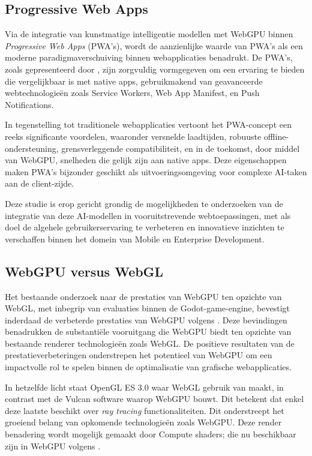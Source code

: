 \subsection{Progressive Web Apps}
Via de integratie van kunstmatige intelligentie modellen met WebGPU binnen \textit{Progressive Web Apps} (PWA's), wordt de aanzienlijke waarde van PWA's als een moderne paradigmaverschuiving binnen webapplicaties benadrukt. 
\bigbreak{}
De PWA's, zoals gepresenteerd door \textcite{Shumylo2023}, zijn zorgvuldig vormgegeven om een ervaring te bieden die vergelijkbaar is met native apps, gebruikmakend van geavanceerde webtechnologieën zoals Service Workers, Web App Manifest, en Push Notifications.

\bigbreak{}
In tegenstelling tot traditionele webapplicaties vertoont het PWA-concept een reeks significante voordelen, waaronder versnelde laadtijden, robuuste offline-ondersteuning, grens\-ver\-le\-ggen\-de compatibiliteit, en in de toekomst, door middel van WebGPU, snelheden die gelijk zijn aan native apps. Deze eigenschappen maken PWA's bijzonder geschikt als uitvoeringsomgeving voor  complexe AI-taken aan de client-zijde.

\bigbreak{}
Deze studie is erop gericht grondig de mogelijkheden te onderzoeken van de integratie van deze AI-modellen in voor\-uit\-stre\-ven\-de webtoepassingen, 
met als doel de algehele gebruikerservaring te verbeteren en innovatieve inzichten te verschaffen binnen het domein van Mobile en Enterprise Development.

\subsection{WebGPU versus WebGL}

Het bestaande onderzoek naar de prestaties van WebGPU ten opzichte van WebGL, met inbegrip van evaluaties binnen de Godot-game-engine, bevestigt inderdaad de verbeterde prestaties van WebGPU volgens \textcite{Fransson2023}. Deze bevindingen benadrukken de substantiële vooruitgang die WebGPU biedt ten opzichte van bestaande renderer technologieën zoals WebGL. De positieve resultaten van de prestatieverbeteringen onderstrepen het potentieel van WebGPU om een impactvolle rol te spelen binnen de optimalisatie van grafische webapplicaties.

\bigbreak{}
In hetzelfde licht staat OpenGL ES 3.0 waar WebGL gebruik van maakt, in contrast met de Vulcan software waarop WebGPU bouwt. Dit betekent dat enkel deze laatste beschikt over \textit{ray tracing} functionaliteiten. Dit onderstreept het groeiend belang van opkomende technologieën zoals Web\-GPU. Deze render benadering wordt mogelijk gemaakt door Compute shaders; die nu beschikbaar zijn in WebGPU volgens \textcite{Beaufort2023}.

